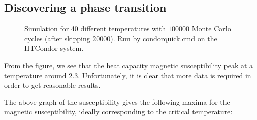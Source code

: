\documentclass[12pt,english,a4paper]{article}
\newcommand{\program}[1]{\href{https://github.com/anjohan/Offentlig/blob/master/FYS3150/Oblig4/#1}{#1}}
\begin{document}
\subsection{Discovering a phase transition}

\begin{figure}[H]
\centering

\caption{Simulation for 40 different temperatures with \(\num{100000}\) Monte Carlo cycles (after skipping \(\num{20000}\)). Run by \program{condorquick.cmd} on the HTCondor system.}
\end{figure}
From the figure, we see that the heat capacity magnetic susceptibility peak at a temperature around \(\num{2.3}\). Unfortunately, it is clear that more data is required in order to get reasonable results.

The above graph of the susceptibility gives the following maxima for the magnetic susceptibility, ideally corresponding to the critical temperature:




\clearpage
{}
\printbibliography
\end{document}
